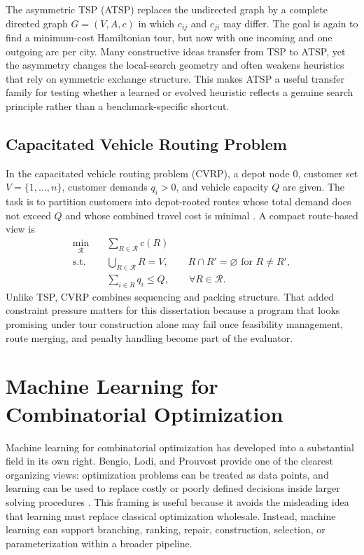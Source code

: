 The asymmetric TSP (ATSP) replaces the undirected graph by a complete directed graph
$G = (V,A,c)$ in which $c_{ij}$ and $c_{ji}$ may differ. The goal is again to find a minimum-cost
Hamiltonian tour, but now with one incoming and one outgoing arc per city. Many constructive ideas
transfer from TSP to ATSP, yet the asymmetry changes the local-search geometry and often weakens
heuristics that rely on symmetric exchange structure. This makes ATSP a useful transfer family for
testing whether a learned or evolved heuristic reflects a genuine search principle rather than a
benchmark-specific shortcut.

\subsection{Capacitated Vehicle Routing Problem}
\label{sec:lit-cvrp}

In the capacitated vehicle routing problem (CVRP), a depot node $0$, customer set
$V = \{1,\dots,n\}$, customer demands $q_i > 0$, and vehicle capacity $Q$ are given. The task is
to partition customers into depot-rooted routes whose total demand does not exceed $Q$ and whose
combined travel cost is minimal \cite{clarke1964,uchoa2017}. A compact route-based view is
\begin{align}
\min_{\mathcal{R}} \quad & \sum_{R \in \mathcal{R}} c(R) \label{eq:lit-cvrp-obj}\\
\text{s.t.} \quad
& \bigcup_{R \in \mathcal{R}} R = V, \qquad
R \cap R' = \varnothing \text{ for } R \neq R', \label{eq:lit-cvrp-partition}\\
& \sum_{i \in R} q_i \le Q, \qquad \forall R \in \mathcal{R}. \label{eq:lit-cvrp-capacity}
\end{align}
Unlike TSP, CVRP combines sequencing and packing structure. That added constraint pressure matters
for this dissertation because a program that looks promising under tour construction alone may fail
once feasibility management, route merging, and penalty handling become part of the evaluator.

\section{Machine Learning for Combinatorial Optimization}
\label{sec:lit-mlco}

Machine learning for combinatorial optimization has developed into a substantial field in its own
right. Bengio, Lodi, and Prouvost provide one of the clearest organizing views: optimization
problems can be treated as data points, and learning can be used to replace costly or poorly
defined decisions inside larger solving procedures \cite{bengio2021mlco}. This framing is useful
because it avoids the misleading idea that learning must replace classical optimization wholesale.
Instead, machine learning can support branching, ranking, repair, construction, selection, or
parameterization within a broader pipeline.

